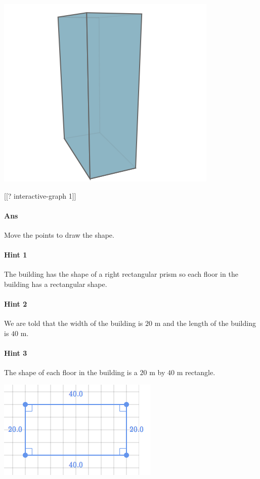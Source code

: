 \documentclass[twocolumn,10pt]{article}
\def\shrinkfactor{0.4}
\begin{document}
\includegraphics[scale=\shrinkfactor]{figures/f388ad536b6ffce43eeefc376654ab275c1a3d4b.png}

[[? interactive-graph 1]]

\paragraph{Ans} Move the points to draw the shape. 

\paragraph{Hint 1}The building has the shape of a right rectangular prism so each floor in the building has a rectangular shape.

\paragraph{Hint 2}We are told that the width of the building is $20\text{ m}$ and the length of the building is $40\text{ m}$.

\paragraph{Hint 3}The shape of each floor in the building is a $20\text{ m}$  by $40\text{ m}$ rectangle.   

\includegraphics[scale=\shrinkfactor]{figures/df92b197fe68d94ef31de36ec178bd4c6c299b24.png}
\end{document}
